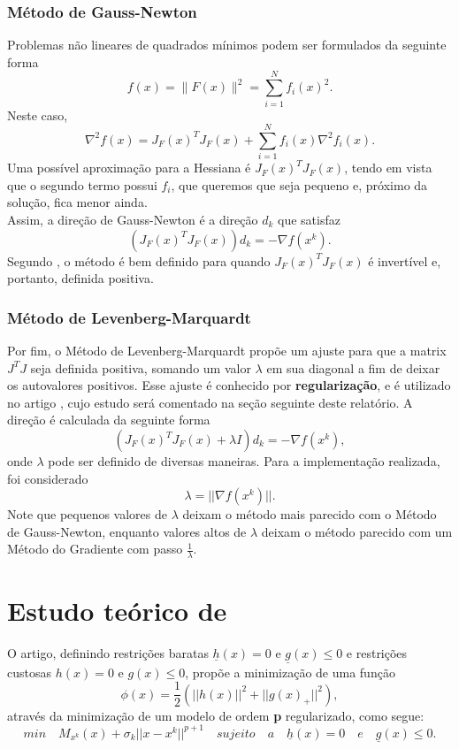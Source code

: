 \documentclass[11pt]{article}
\begin{document}
\subsubsection*{Método de Gauss-Newton}
Problemas não lineares de quadrados mínimos podem ser formulados da seguinte forma 
$$f(x)=\|F(x)\|^2=\sum_{i=1}^N f_i(x)^2.$$
Neste caso, $$\nabla^2 f(x)= J_F(x)^T J_F(x)+\sum_{i=1}^N f_i(x) \nabla^2 f_i(x).$$
Uma possível aproximação para a Hessiana é $J_F(x)^T J_F(x)$, tendo em vista que o segundo termo possui $f_i$, que queremos que seja pequeno e, próximo da solução, fica menor ainda. \\


\noindent
Assim, a direção de Gauss-Newton é a direção $d_k$ que satisfaz $$(J_F(x)^T J_F(x)) d_k = - \nabla f(x^k).$$
Segundo  \cite{artigoLevenberg}, o método é bem definido para quando $J_F(x)^T J_F(x)$ é invertível e, portanto, definida positiva. 

\subsubsection*{Método de Levenberg-Marquardt}
Por fim, o Método de Levenberg-Marquardt propõe um ajuste para que a matrix $J^TJ$ seja definida positiva, somando um valor $\lambda$ em sua diagonal a fim de deixar os autovalores positivos. Esse ajuste é conhecido por \textbf{regularização}, e é utilizado no artigo  \cite{bmLS}, cujo estudo será comentado na seção seguinte deste relatório. A direção é calculada da seguinte forma
$$(J_F(x)^T J_F(x) + \lambda I) d_k = - \nabla f(x^k),$$
onde $\lambda$ pode ser definido de diversas maneiras. Para a implementação realizada, foi considerado $$\lambda = ||\nabla f(x^k)||.$$ 
Note que pequenos valores de $\lambda$ deixam o método mais parecido com o Método de Gauss-Newton, enquanto valores altos de $\lambda$ deixam o método parecido com um Método do Gradiente com passo $\frac{1}{\lambda}$.

\section{Estudo teórico de  \cite{bmLS}}
O artigo, definindo restrições baratas $\underline{h}(x) = 0$ e $\underline{g}(x) \leq 0$ e restrições custosas $h(x) = 0$ e $g(x) \leq 0$, propõe a minimização de uma função 
$$\phi (x) = \frac{1}{2}(||h(x)||^2 + ||g(x)_{+}||^2),$$
através da minimização de um modelo de ordem \textbf{p} regularizado, como segue:
$$min \quad M_{x^{k}}(x) + \sigma _{k}||x - x^{k}||^{p + 1} \quad sujeito\quad a \quad \underline{h}(x) = 0 \quad e \quad \underline{g}(x) \leq 0.$$
\end{document}
